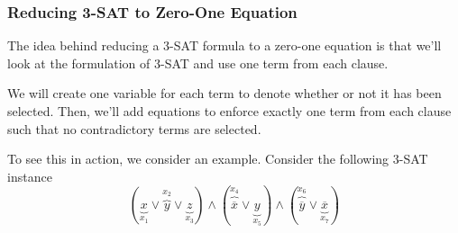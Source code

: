 \documentclass[letterpaper]{article}
\begin{document}
\subsubsection{Reducing 3-SAT to Zero-One Equation}
The idea behind reducing a 3-SAT formula to a zero-one equation is that we'll look at the formulation of 3-SAT and use one term from each clause. 

\bigskip 

We will create one variable for each term to denote whether or not it has been selected. Then, we'll add equations to enforce exactly one term from each clause such that no contradictory terms are selected. 

\bigskip 

To see this in action, we consider an example. Consider the following 3-SAT instance 
\[(\underbrace{x}_{x_1} \lor \overbrace{y}^{x_2} \lor \underbrace{z}_{x_3}) \land (\overbrace{\overline{x}}^{x_4} \lor \underbrace{y}_{x_5}) \land (\overbrace{\overline{y}}^{x_6} \lor \underbrace{\overline{x}}_{x_7})\]
\end{document}
